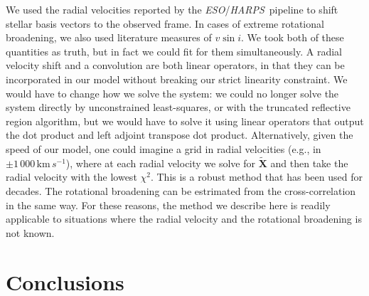 \documentclass[modern]{aastex631}
\newcommand{\project}[1]{\textit{#1}}
\renewcommand{\vec}[1]{\mathbf{#1}}
\newcommand{\eso}{\project{ESO}}
\newcommand{\harps}{\project{HARPS}}
\begin{document}
We used the radial velocities reported by the \eso/\harps\ pipeline to shift stellar basis vectors to the observed frame. In cases of extreme rotational broadening, we also used literature measures of $v\sin{i}$. We took both of these quantities as truth, but in fact we could fit for them simultaneously. A radial velocity shift and a convolution are both linear operators, in that they can be incorporated in our model without breaking our strict linearity constraint. We would have to change how we solve the system: we could no longer solve the system directly by unconstrained least-squares, or with the truncated reflective region algorithm, but we would have to solve it using linear operators that output the dot product and left adjoint transpose dot product. Alternatively, given the speed of our model, one could imagine a grid in radial velocities (e.g., in $\pm1\,000\,\mathrm{km}\,s^{-1}$), where at each radial velocity we solve for $\vec{\tilde{X}}$ and then take the radial velocity with the lowest $\chi^2$. This is a robust method that has been used for decades. The rotational broadening can be estrimated from the cross-correlation in the same way. For these reasons, the method we describe here is readily applicable to situations where the radial velocity and the rotational broadening is not known.\\




\section{Conclusions} \label{sec:conclusions}
\end{document}

